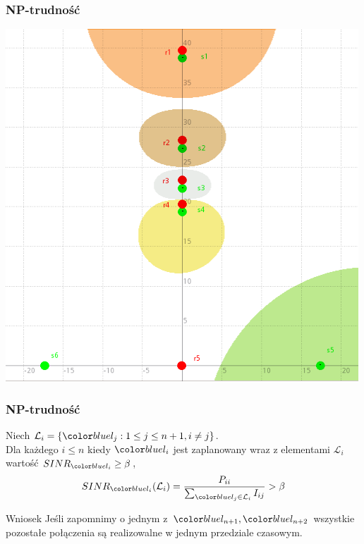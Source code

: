 \documentclass[polish, t,10pt]{beamer}
\begin{document}
\begin{frame}
    \frametitle{NP-trudność}
    \centering
    \includegraphics{pictures/np-placement3.png}
\end{frame}
\begin{frame}
    \frametitle{NP-trudność}
    \begin{lemma}
        Niech $\mathcal{L}_i = \{\lj: 1 \leq j \leq n + 1, i \neq j\}$.\\
        Dla każdego $i \leq n$ kiedy $\li$ jest zaplanowany wraz z elementami $\mathcal{L}_i$ wartość $SINR_\li \ge \beta$,
        $$
            SINR_\li(\mathcal{L}_i) = \frac{P_{ii}}{\sum_{\lj \in \mathcal{L}_i} I_{ij}} > \beta
        $$
    \end{lemma}
    \pause
    \begin{block}{Wniosek}
        Jeśli zapomnimy o jednym z $\lno, \lnt$ wszystkie pozostałe połączenia są realizowalne w jednym przedziale czasowym.
    \end{block}
\end{frame}
\end{document}
